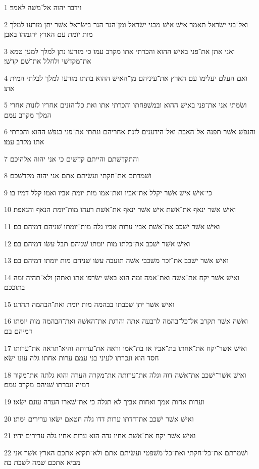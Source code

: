 \par 1 וידבר יהוה אל־משׁה לאמר׃
\par 2 ואל־בני ישׂראל תאמר אישׁ אישׁ מבני ישׂראל ומן־הגר הגר בישׂראל אשׁר יתן מזרעו למלך מות יומת עם הארץ ירגמהו באבן׃
\par 3 ואני אתן את־פני באישׁ ההוא והכרתי אתו מקרב עמו כי מזרעו נתן למלך למען טמא את־מקדשׁי ולחלל את־שׁם קדשׁי׃
\par 4 ואם העלם יעלימו עם הארץ את־עיניהם מן־האישׁ ההוא בתתו מזרעו למלך לבלתי המית אתו׃
\par 5 ושׂמתי אני את־פני באישׁ ההוא ובמשׁפחתו והכרתי אתו ואת כל־הזנים אחריו לזנות אחרי המלך מקרב עמם׃
\par 6 והנפשׁ אשׁר תפנה אל־האבת ואל־הידענים לזנת אחריהם ונתתי את־פני בנפשׁ ההוא והכרתי אתו מקרב עמו׃
\par 7 והתקדשׁתם והייתם קדשׁים כי אני יהוה אלהיכם׃
\par 8 ושׁמרתם את־חקתי ועשׂיתם אתם אני יהוה מקדשׁכם׃
\par 9 כי־אישׁ אישׁ אשׁר יקלל את־אביו ואת־אמו מות יומת אביו ואמו קלל דמיו בו׃
\par 10 ואישׁ אשׁר ינאף את־אשׁת אישׁ אשׁר ינאף את־אשׁת רעהו מות־יומת הנאף והנאפת׃
\par 11 ואישׁ אשׁר ישׁכב את־אשׁת אביו ערות אביו גלה מות־יומתו שׁניהם דמיהם בם׃
\par 12 ואישׁ אשׁר ישׁכב את־כלתו מות יומתו שׁניהם תבל עשׂו דמיהם בם׃
\par 13 ואישׁ אשׁר ישׁכב את־זכר משׁכבי אשׁה תועבה עשׂו שׁניהם מות יומתו דמיהם בם׃
\par 14 ואישׁ אשׁר יקח את־אשׁה ואת־אמה זמה הוא באשׁ ישׂרפו אתו ואתהן ולא־תהיה זמה בתוככם׃
\par 15 ואישׁ אשׁר יתן שׁכבתו בבהמה מות יומת ואת־הבהמה תהרגו׃
\par 16 ואשׁה אשׁר תקרב אל־כל־בהמה לרבעה אתה והרגת את־האשׁה ואת־הבהמה מות יומתו דמיהם בם׃
\par 17 ואישׁ אשׁר־יקח את־אחתו בת־אביו או בת־אמו וראה את־ערותה והיא־תראה את־ערותו חסד הוא ונכרתו לעיני בני עמם ערות אחתו גלה עונו ישׂא׃
\par 18 ואישׁ אשׁר־ישׁכב את־אשׁה דוה וגלה את־ערותה את־מקרה הערה והוא גלתה את־מקור דמיה ונכרתו שׁניהם מקרב עמם׃
\par 19 וערות אחות אמך ואחות אביך לא תגלה כי את־שׁארו הערה עונם ישׂאו׃
\par 20 ואישׁ אשׁר ישׁכב את־דדתו ערות דדו גלה חטאם ישׂאו ערירים ימתו׃
\par 21 ואישׁ אשׁר יקח את־אשׁת אחיו נדה הוא ערות אחיו גלה ערירים יהיו׃
\par 22 ושׁמרתם את־כל־חקתי ואת־כל־משׁפטי ועשׂיתם אתם ולא־תקיא אתכם הארץ אשׁר אני מביא אתכם שׁמה לשׁבת בה׃
